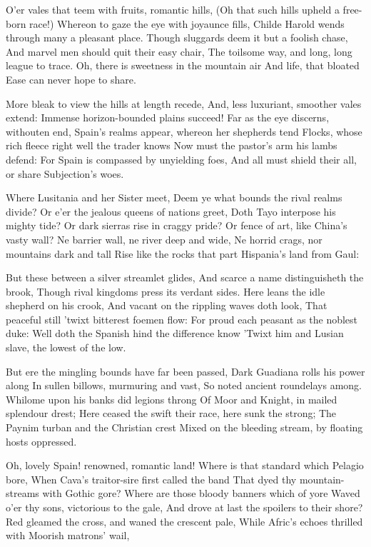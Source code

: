 \documentclass[10pt,twocolumn]{book}
\begin{document}
   O'er vales that teem with fruits, romantic hills,
   (Oh that such hills upheld a free-born race!)
   Whereon to gaze the eye with joyaunce fills,
   Childe Harold wends through many a pleasant place.
   Though sluggards deem it but a foolish chase,
   And marvel men should quit their easy chair,
   The toilsome way, and long, long league to trace.
   Oh, there is sweetness in the mountain air
And life, that bloated Ease can never hope to share.


   More bleak to view the hills at length recede,
   And, less luxuriant, smoother vales extend:
   Immense horizon-bounded plains succeed!
   Far as the eye discerns, withouten end,
   Spain's realms appear, whereon her shepherds tend
   Flocks, whose rich fleece right well the trader knows\textemdash
   Now must the pastor's arm his lambs defend:
   For Spain is compassed by unyielding foes,
And all must shield their all, or share Subjection's woes.


   Where Lusitania and her Sister meet,
   Deem ye what bounds the rival realms divide?
   Or e'er the jealous queens of nations greet,
   Doth Tayo interpose his mighty tide?
   Or dark sierras rise in craggy pride?
   Or fence of art, like China's vasty wall?\textemdash
   Ne barrier wall, ne river deep and wide,
   Ne horrid crags, nor mountains dark and tall
Rise like the rocks that part Hispania's land from Gaul:


   But these between a silver streamlet glides,
   And scarce a name distinguisheth the brook,
   Though rival kingdoms press its verdant sides.
   Here leans the idle shepherd on his crook,
   And vacant on the rippling waves doth look,
   That peaceful still 'twixt bitterest foemen flow:
   For proud each peasant as the noblest duke:
   Well doth the Spanish hind the difference know
'Twixt him and Lusian slave, the lowest of the low.


   But ere the mingling bounds have far been passed,
   Dark Guadiana rolls his power along
   In sullen billows, murmuring and vast,
   So noted ancient roundelays among.
   Whilome upon his banks did legions throng
   Of Moor and Knight, in mailed splendour drest;
   Here ceased the swift their race, here sunk the strong;
   The Paynim turban and the Christian crest
Mixed on the bleeding stream, by floating hosts oppressed.


   Oh, lovely Spain! renowned, romantic land!
   Where is that standard which Pelagio bore,
   When Cava's traitor-sire first called the band
   That dyed thy mountain-streams with Gothic gore?
   Where are those bloody banners which of yore
   Waved o'er thy sons, victorious to the gale,
   And drove at last the spoilers to their shore?
   Red gleamed the cross, and waned the crescent pale,
While Afric's echoes thrilled with Moorish matrons' wail,
\end{document}
